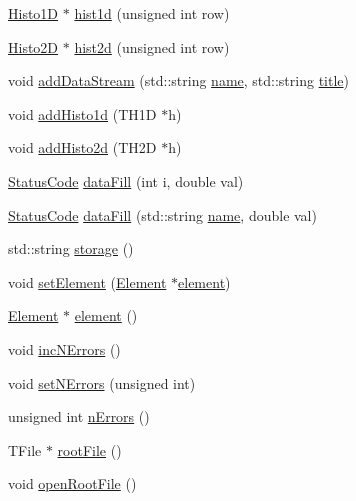 \begin{DoxyCompactItemize}
\item 
\hyperlink{classHisto1D}{Histo1D} $\ast$ \hyperlink{classProcessus_a409227db936baff03c0462c1bcfe8069}{hist1d} (unsigned int row)
\item 
\hyperlink{classHisto2D}{Histo2D} $\ast$ \hyperlink{classProcessus_a73b5118cb5f2b5eaad33286183b86cfc}{hist2d} (unsigned int row)
\item 
void \hyperlink{classProcessus_a308c8f193802f1d1ab49d4447d0cb281}{add\+Data\+Stream} (std\+::string \hyperlink{classObject_a300f4c05dd468c7bb8b3c968868443c1}{name}, std\+::string \hyperlink{classObject_a73a0f1a41828fdd8303dd662446fb6c3}{title})
\item 
void \hyperlink{classProcessus_ad46e0d4dfdfdcbce001ee6be1746dfa4}{add\+Histo1d} (T\+H1D $\ast$h)
\item 
void \hyperlink{classProcessus_ac1ed1aed5edaeabdf18aa56775440471}{add\+Histo2d} (T\+H2D $\ast$h)
\item 
\hyperlink{classStatusCode}{Status\+Code} \hyperlink{classProcessus_a0d093b48f3218a088ba030e24372f18c}{data\+Fill} (int i, double val)
\item 
\hyperlink{classStatusCode}{Status\+Code} \hyperlink{classProcessus_aa31ab71711f7af6a729441ff573f69c9}{data\+Fill} (std\+::string \hyperlink{classObject_a300f4c05dd468c7bb8b3c968868443c1}{name}, double val)
\item 
std\+::string \hyperlink{classProcessus_a33fa1a0b54a636e5cdd680669fd9ea51}{storage} ()
\item 
void \hyperlink{classProcessus_a8ddef94227d83d9dae2cd49aebc33353}{set\+Element} (\hyperlink{classElement}{Element} $\ast$\hyperlink{classProcessus_a6fe155527431a7190b7d44d600b9608d}{element})
\item 
\hyperlink{classElement}{Element} $\ast$ \hyperlink{classProcessus_a6fe155527431a7190b7d44d600b9608d}{element} ()
\item 
void \hyperlink{classProcessus_abe603d0636f76db6aa6c5c60cf34c591}{inc\+N\+Errors} ()
\item 
void \hyperlink{classProcessus_a831b027b9cf18ab56fa6147b5d3055da}{set\+N\+Errors} (unsigned int)
\item 
unsigned int \hyperlink{classProcessus_a82a0487f82f07cc2c2dc2731f98149e7}{n\+Errors} ()
\item 
T\+File $\ast$ \hyperlink{classProcessus_a247e8c362ec08422cf53d08dd23b093c}{root\+File} ()
\item 
void \hyperlink{classProcessus_aacf6812880c1d1a2bf14a4a39458f443}{open\+Root\+File} ()
\item 

\end{DoxyCompactItemize}
